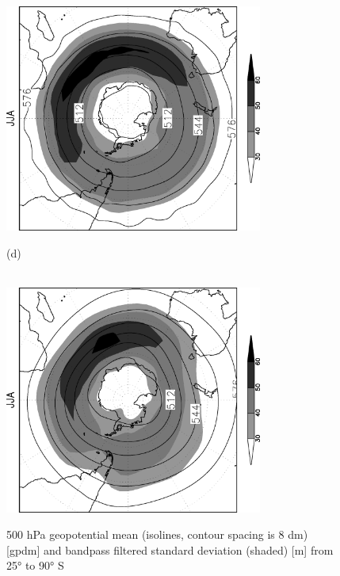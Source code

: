 \documentclass[12pt,a4paper,twoside,openright,headinclude,liststotoc,bibtotoc]{scrreprt}
\begin{document}
\begin{figure}[c]
{\includegraphics[height=7.5cm,angle=-90]
{eps/SHz500StdbpJJA.eps}
}
\parbox{8.5cm}{\hspace{0.02cm}\begin{scriptsize}(d)\end{scriptsize} \vspace{-0.3cm} \\
\includegraphics[height=7.5cm,angle=-90]
{eps/SHt21z500StdbpJJA.eps}
}
\caption[Southern Hemisphere 500 hPa geopotential mean and bandpass filtered standard deviation]{500 hPa geopotential mean (isolines, contour spacing is 8 dm) [gpdm] and bandpass filtered standard deviation (shaded) [m] from 25° to 90° S}
\label{img:z500S}
\end{figure}
\end{document}
